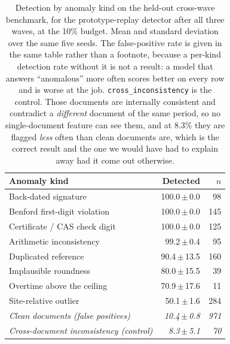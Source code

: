 \begin{table}[htbp]
\centering
\caption{Detection by anomaly kind on the held-out cross-wave benchmark, for the
prototype-replay detector after all three waves, at the 10\% budget. Mean and
standard deviation over the same five seeds. The false-positive rate is given in
the same table rather than a footnote, because a per-kind detection rate without
it is not a result: a model that answers ``anomalous'' more often scores better
on every row and is worse at the job. \texttt{cross\_inconsistency} is the
control. Those documents are internally consistent and contradict a
\emph{different} document of the same period, so no single-document feature can
see them, and at 8.3\% they are flagged \emph{less} often than clean documents
are, which is the correct result and the one we would have had to explain away
had it come out otherwise.}
\label{tab:corpus_kinds}
\small
\begin{tabular}{@{}l r r@{}}
\toprule
\textbf{Anomaly kind} & \textbf{Detected} & \textbf{$n$} \\
\midrule
Back-dated signature          & 100.0\,$\pm$\,0.0 &  98 \\
Benford first-digit violation & 100.0\,$\pm$\,0.0 & 145 \\
Certificate / CAS check digit & 100.0\,$\pm$\,0.0 & 125 \\
Arithmetic inconsistency      &  99.2\,$\pm$\,0.4 &  95 \\
Duplicated reference          &  90.4\,$\pm$\,13.5 & 160 \\
Implausible roundness         &  80.0\,$\pm$\,15.5 &  39 \\
Overtime above the ceiling    &  70.9\,$\pm$\,17.6 &  11 \\
Site-relative outlier         &  50.1\,$\pm$\,1.6 & 284 \\
\midrule
\textit{Clean documents (false positives)} & \textit{10.4\,$\pm$\,0.8} & \textit{971} \\
\textit{Cross-document inconsistency (control)} & \textit{8.3\,$\pm$\,5.1} & \textit{70} \\
\bottomrule
\end{tabular}
\end{table}
